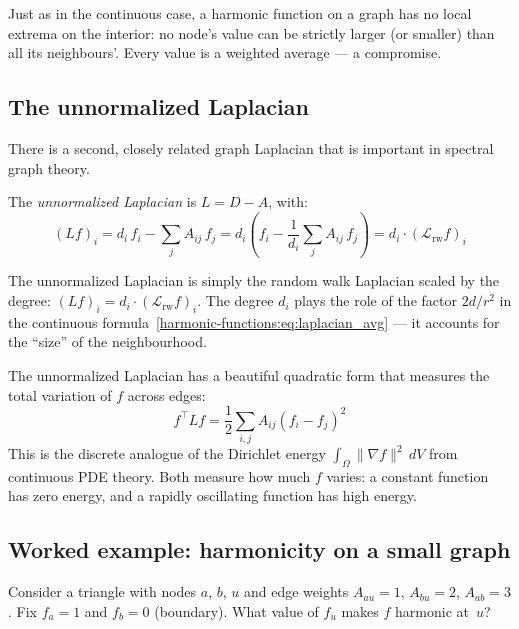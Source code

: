 \begin{notechapter}
Just as in the continuous case, a harmonic function on a graph has no local
extrema on the interior: no node's value can be strictly larger (or smaller)
than all its neighbours'. Every value is a weighted average --- a compromise.

\subsection{The unnormalized Laplacian}

There is a second, closely related graph Laplacian that is important in
spectral graph theory.

\begin{definition}
\label{harmonic-functions:def:unnorm_laplacian}
The \emph{unnormalized Laplacian} is $L = D - A$, with:
\begin{equation}
(Lf)_i = d_i\,f_i - \sum_j A_{ij}\,f_j
= d_i\left(f_i - \frac{1}{d_i}\sum_j A_{ij}\,f_j\right)
= d_i \cdot (\mathcal{L}_{\mathrm{rw}} f)_i
\end{equation}
\end{definition}

The unnormalized Laplacian is simply the random walk Laplacian scaled by the
degree: $(Lf)_i = d_i \cdot (\mathcal{L}_{\mathrm{rw}} f)_i$. The degree
$d_i$ plays the role of the factor $2d/r^2$ in the continuous
formula~\eqref{harmonic-functions:eq:laplacian_avg} --- it accounts for the ``size'' of the
neighbourhood.

The unnormalized Laplacian has a beautiful quadratic form that measures
the total variation of $f$ across edges:
\begin{equation}
\label{harmonic-functions:eq:laplacian_quadratic}
f^\top L f = \frac{1}{2}\sum_{i,j} A_{ij}(f_i - f_j)^2
\end{equation}
This is the discrete analogue of the Dirichlet energy
$\int_\Omega \|\nabla f\|^2\,dV$ from continuous PDE theory. Both measure
how much $f$ varies: a constant function has zero energy, and a rapidly
oscillating function has high energy.

\subsection{Worked example: harmonicity on a small graph}

\begin{example}
Consider a triangle with nodes $a$, $b$, $u$ and edge weights
$A_{au} = 1$, $A_{bu} = 2$, $A_{ab} = 3$. Fix $f_a = 1$ and
$f_b = 0$ (boundary). What value of $f_u$ makes $f$ harmonic at~$u$?


\end{example}
\end{notechapter}
